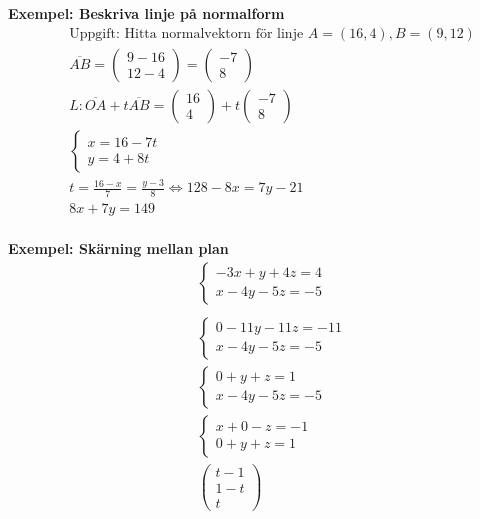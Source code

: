 \textbf{Exempel: Beskriva linje på normalform} 
\begin{align*} %
  &\quad  \text{Uppgift: Hitta normalvektorn för linje } A=(16,4), B=(9,12) \\
  &\quad  \overline{AB} = 
  \begin{pmatrix} 9-16 \\ 12-4 \end{pmatrix} = \begin{pmatrix} -7 \\ 8 \end{pmatrix} \\
  &\quad  L: \overline{OA}+t\overline{AB}=
  \begin{pmatrix} 16 \\ 4 \end{pmatrix} + t\begin{pmatrix} -7 \\ 8 \end{pmatrix} \\
  &\quad  \left\{\begin{array}{r}
  x=16-7t \\
  y=4+8t  
  \end{array}\right. \\
  &\quad  t=\frac{16-x}{7}=\frac{y-3}{8} \Leftrightarrow{} 128 -8x=7y-21 \\
  &\quad  8x+7y=149 \\
\end{align*}

\textbf{Exempel: Skärning mellan plan} %
\begin{align*} %
  &\quad  \left\{\begin{array}{r}
  -3x+y+4z=4 \\
  x-4y-5z=-5 
  \end{array}\right. \\
  &\quad  \\
  &\quad  \left\{\begin{array}{r}
  0-11y-11z=-11 \\
  x-4y-5z=-5 
  \end{array}\right. \\
  &\quad  \left\{\begin{array}{r}
  0+y+z=1 \\
  x-4y-5z=-5 
  \end{array}\right. \\
  &\quad  \left\{\begin{array}{r}
  x+0-z=-1 \\
  0+y+z=1 
  \end{array}\right. \\
  &\quad  \begin{pmatrix} t-1 \\ 1-t \\ t \end{pmatrix} \\
\end{align*}


